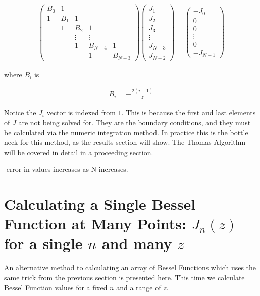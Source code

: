 \documentclass[onecolumn, groupedaddress, 10pt]{revtex4-1}
\begin{document}
\begin{align}
\label{eqn:finalDiscretizedBesselMatrixEqn}
\left( \begin{array}{ccccc}
	B_0 &  1  &         &         &         \\
	 1  & B_1 &    1    &         &         \\
	    &  1  &   B_2   &    1    &         \\
	    &     & \vdots  & \vdots  &         \\
	    &     &    1    & B_{N-4} &    1    \\
	    &     &         &    1    & B_{N-3}
\end{array} \right)
\left( \begin{array}{c}
	  J_1   \\
	  J_2   \\
	  J_3   \\
	\vdots  \\
	J_{N-3} \\
	J_{N-2}
\end{array} \right)
=
\left( \begin{array}{c}
	- J_0      \\
	   0       \\
       0       \\
	 \vdots    \\
	   0       \\
	- J_{N-1}
\end{array} \right)
\end{align}

where $B_i$ is

\begin{align}
B_i = - \frac{2(i+1)}{z}
\end{align}

Notice the $J_i$ vector is indexed from $1$.  This is because the first and last elements of $J$ are not being solved for.  They are the boundary conditions, and they must be calculated via the numeric integration method.  In practice this is the bottle neck for this method, as the results section will show.  The Thomas Algorithm will be covered in detail in a proceeding section.

-error in values increases as N increases.


\section{Calculating a Single Bessel Function at Many Points: $J_n(z)$ for a single $n$ and many $z$ \label{sec:calcBesselConstN}}
An alternative method to calculating an array of Bessel Functions which uses the same trick from the previous section is presented here.  This time we calculate Bessel Function values for a fixed $n$ and a range of $z$.
\end{document}
